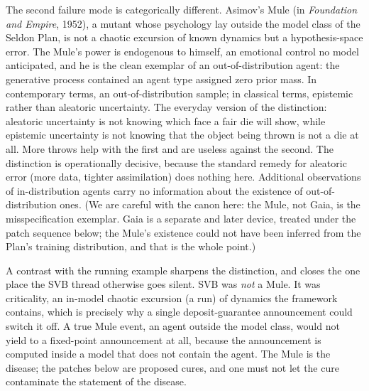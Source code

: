 \documentclass[11pt]{article}
\begin{document}
The second failure mode is categorically different. Asimov's Mule (in \emph{Foundation and Empire}, 1952), a mutant whose psychology lay outside the model class of the Seldon Plan, is not a chaotic excursion of known dynamics but a hypothesis-space error. The Mule's power is endogenous to himself, an emotional control no model anticipated, and he is the clean exemplar of an out-of-distribution agent: the generative process contained an agent type assigned zero prior mass. In contemporary terms, an out-of-distribution sample; in classical terms, epistemic rather than aleatoric uncertainty. The everyday version of the distinction: aleatoric uncertainty is not knowing which face a fair die will show, while epistemic uncertainty is not knowing that the object being thrown is not a die at all. More throws help with the first and are useless against the second. The distinction is operationally decisive, because the standard remedy for aleatoric error (more data, tighter assimilation) does nothing here. Additional observations of in-distribution agents carry no information about the existence of out-of-distribution ones. (We are careful with the canon here: the Mule, not Gaia, is the misspecification exemplar. Gaia is a separate and later device, treated under the patch sequence below; the Mule's existence could not have been inferred from the Plan's training distribution, and that is the whole point.)

A contrast with the running example sharpens the distinction, and closes the one place the SVB thread otherwise goes silent. SVB was \emph{not} a Mule. It was criticality, an in-model chaotic excursion (a run) of dynamics the framework contains, which is precisely why a single deposit-guarantee announcement could switch it off. A true Mule event, an agent outside the model class, would not yield to a fixed-point announcement at all, because the announcement is computed inside a model that does not contain the agent. The Mule is the disease; the patches below are proposed cures, and one must not let the cure contaminate the statement of the disease.
\end{document}
